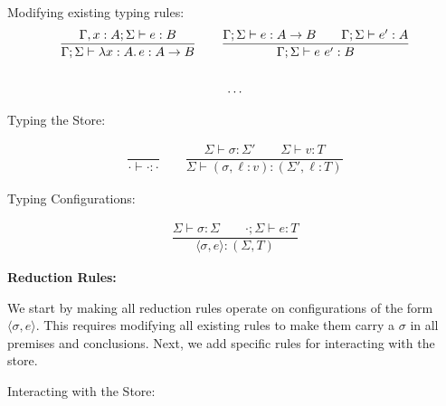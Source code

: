 \documentclass[10pt,\jkfside,a4paper]{article}
\newcommand{\abr}[2]{\ensuremath{\langle #1, #2 \rangle}}
\begin{document}
\begin{enumerate}
    Modifying existing typing rules:
    \begin{gather*}
        \dfrac{
        \Gamma, x: A; \Sigma \vdash e: B
        }{
        \Gamma; \Sigma \vdash \lambda x: A\ldotp e: A \to B
        }
        \qquad
        \dfrac{
        \Gamma; \Sigma \vdash e: A \to B
        \qquad
        \Gamma; \Sigma \vdash e': A
        }{
        \Gamma; \Sigma \vdash e\ e': B
        }
        \\\\
        \ldots
    \end{gather*}

    Typing the Store:

    \begin{gather*}
        \dfrac{
        }{
            \cdot \vdash \cdot: \cdot
        }
        \qquad
        \dfrac{
            \Sigma \vdash \sigma: \Sigma' \qquad \Sigma \vdash v: T
        }{
            \Sigma \vdash (\sigma, \ell: v): (\Sigma', \ell: T)
        }
    \end{gather*}

    Typing Configurations:

    \begin{gather*}
        \dfrac{
            \Sigma \vdash \sigma: \Sigma \qquad \cdot; \Sigma \vdash e: T
        }{
            \abr{\sigma}{e}: (\Sigma, T)
        }
    \end{gather*}

    \textbf{Reduction Rules:}

    We start by making all reduction rules operate on configurations of the form $\abr{\sigma}{e}$. This requires modifying all existing rules to make them carry a $\sigma$ in all premises and
    conclusions. Next, we add specific rules for interacting with the store.

    Interacting with the Store:


\end{enumerate}
\end{document}
